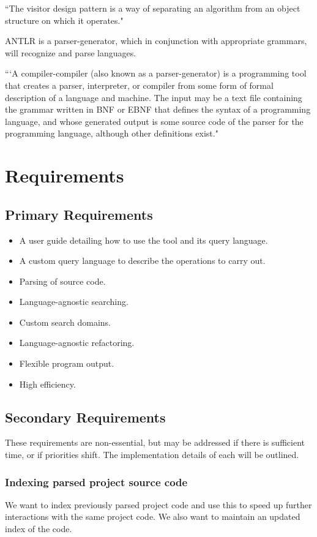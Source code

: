 \documentclass[12pt, letterpaper]{article}
\begin{document}
``The visitor design pattern is a way of separating an algorithm from an object structure on which it operates." \autocite{wikipediavisitorpattern}

ANTLR is a parser-generator, which in conjunction with appropriate grammars, will recognize and parse languages.

```A compiler-compiler (also known as a parser-generator) is a programming tool that creates a parser, interpreter, or compiler from some form of formal description of a language and machine. The input may be a text file containing the grammar written in BNF or EBNF that defines the syntax of a programming language, and whose generated output is some source code of the parser for the programming language, although other definitions exist." \autocite{wikipediacompilercompiler}

\section{Requirements}
\subsection{Primary Requirements}
\begin{itemize}
  \item A user guide detailing how to use the tool and its query language.
  \item A custom query language to describe the operations to carry out.
  \item Parsing of source code.
  \item Language-agnostic searching.
  \item Custom search domains.
  \item Language-agnostic refactoring.
  \item Flexible program output.
  \item High efficiency.
\end{itemize}

\subsection{Secondary Requirements}
These requirements are non-essential, but may be addressed if there is sufficient time, or if priorities shift.
The implementation details of each will be outlined.

\subsubsection{Indexing parsed project source code}
We want to index previously parsed project code and use this to speed up further interactions with the same project code.
We also want to maintain an updated index of the code.
\end{document}
